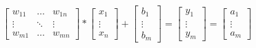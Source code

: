 \[
   \begin{bmatrix} 
    w_{11} & \dots  & w_{1n} \\
    \vdots & \ddots & \vdots \\
    w_{m1} & \dots  & w_{mn} 
    \end{bmatrix}
    *
    \begin{bmatrix} 
    x_{1} \\
    \vdots \\
    x_{n} 
    \end{bmatrix}
    +
    \begin{bmatrix} 
    b_{1} \\
    \vdots \\
    b_{m} 
    \end{bmatrix}
    =
    \begin{bmatrix} 
    y_{1} \\
    \vdots \\
    y_{m} 
    \end{bmatrix}
    = 
    \begin{bmatrix} 
    a_{1} \\
    \vdots \\
    a_{m} 
    \end{bmatrix}
\]